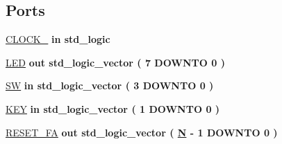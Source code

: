 \subsection*{Ports}
 \begin{DoxyCompactItemize}
\item 
\hyperlink{class_d_e0___n_a_n_o___v_f_a4b5e1e3eba67b2e61c77c9a719d8518c}{C\+L\+O\+C\+K\+\_}  {\bfseries {\bfseries \textcolor{keywordflow}{in}\textcolor{vhdlchar}{ }}} {\bfseries \textcolor{comment}{std\+\_\+logic}\textcolor{vhdlchar}{ }} 
\item 
\hyperlink{class_d_e0___n_a_n_o___v_f_a424944084857f6787a0ddb567d0b5240}{L\+E\+D}  {\bfseries {\bfseries \textcolor{keywordflow}{out}\textcolor{vhdlchar}{ }}} {\bfseries \textcolor{comment}{std\+\_\+logic\+\_\+vector}\textcolor{vhdlchar}{ }\textcolor{vhdlchar}{(}\textcolor{vhdlchar}{ }\textcolor{vhdlchar}{ } \textcolor{vhdldigit}{7} \textcolor{vhdlchar}{ }\textcolor{keywordflow}{D\+O\+W\+N\+T\+O}\textcolor{vhdlchar}{ }\textcolor{vhdlchar}{ } \textcolor{vhdldigit}{0} \textcolor{vhdlchar}{ }\textcolor{vhdlchar}{)}\textcolor{vhdlchar}{ }} 
\item 
\hyperlink{class_d_e0___n_a_n_o___v_f_a30974727c81621f672f7f9490463f9d3}{S\+W}  {\bfseries {\bfseries \textcolor{keywordflow}{in}\textcolor{vhdlchar}{ }}} {\bfseries \textcolor{comment}{std\+\_\+logic\+\_\+vector}\textcolor{vhdlchar}{ }\textcolor{vhdlchar}{(}\textcolor{vhdlchar}{ }\textcolor{vhdlchar}{ } \textcolor{vhdldigit}{3} \textcolor{vhdlchar}{ }\textcolor{keywordflow}{D\+O\+W\+N\+T\+O}\textcolor{vhdlchar}{ }\textcolor{vhdlchar}{ } \textcolor{vhdldigit}{0} \textcolor{vhdlchar}{ }\textcolor{vhdlchar}{)}\textcolor{vhdlchar}{ }} 
\item 
\hyperlink{class_d_e0___n_a_n_o___v_f_aa70bf9245705f33e4529eb81df3fbf94}{K\+E\+Y}  {\bfseries {\bfseries \textcolor{keywordflow}{in}\textcolor{vhdlchar}{ }}} {\bfseries \textcolor{comment}{std\+\_\+logic\+\_\+vector}\textcolor{vhdlchar}{ }\textcolor{vhdlchar}{(}\textcolor{vhdlchar}{ }\textcolor{vhdlchar}{ } \textcolor{vhdldigit}{1} \textcolor{vhdlchar}{ }\textcolor{keywordflow}{D\+O\+W\+N\+T\+O}\textcolor{vhdlchar}{ }\textcolor{vhdlchar}{ } \textcolor{vhdldigit}{0} \textcolor{vhdlchar}{ }\textcolor{vhdlchar}{)}\textcolor{vhdlchar}{ }} 
\item 
\hyperlink{class_d_e0___n_a_n_o___v_f_ab6bd5afe8823c3590ef5e4195757f852}{R\+E\+S\+E\+T\+\_\+\+F\+A}  {\bfseries {\bfseries \textcolor{keywordflow}{out}\textcolor{vhdlchar}{ }}} {\bfseries \textcolor{comment}{std\+\_\+logic\+\_\+vector}\textcolor{vhdlchar}{ }\textcolor{vhdlchar}{(}\textcolor{vhdlchar}{ }\textcolor{vhdlchar}{ }\textcolor{vhdlchar}{ }\textcolor{vhdlchar}{ }{\bfseries \hyperlink{class_d_e0___n_a_n_o___v_f_af855138be951f4c562436dfd59f85b54}{N}} \textcolor{vhdlchar}{-\/}\textcolor{vhdlchar}{ } \textcolor{vhdldigit}{1} \textcolor{vhdlchar}{ }\textcolor{keywordflow}{D\+O\+W\+N\+T\+O}\textcolor{vhdlchar}{ }\textcolor{vhdlchar}{ } \textcolor{vhdldigit}{0} \textcolor{vhdlchar}{ }\textcolor{vhdlchar}{)}\textcolor{vhdlchar}{ }} 

\end{DoxyCompactItemize}
